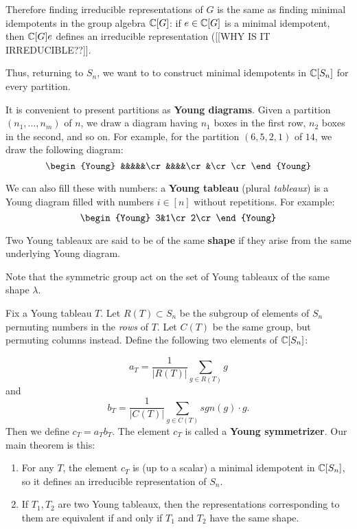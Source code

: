 \documentclass[11pt, english]{article}
\begin{document}
Therefore finding irreducible representations of $G$ is the same as finding minimal idempotents in the group algebra $\mathbb{C}[G]$: if $e \in \mathbb{C}[G]$ is a minimal idempotent, then $\mathbb{C}[G]e$ defines an irreducible representation ([[WHY IS IT IRREDUCIBLE??]].

Thus, returning to $S_n$, we want to to construct minimal idempotents in $\mathbb{C}[S_n]$ for every partition.

It is convenient to present partitions as \textbf{Young diagrams}. Given a partition $(n_1,\ldots,n_m)$ of $n$, we draw a diagram having $n_1$ boxes in the first row, $n_2$ boxes in the second, and so on. For example, for the partition $(6,5,2,1)$ of $14$, we draw the following diagram:
$$
\begin{Young}
&&&&&\cr
&&&&\cr
&\cr
\cr
\end{Young}
$$

We can also fill these with numbers: a \textbf{Young tableau} (plural \emph{tableaux}) is a Young diagram filled with numbers $i \in [n]$ without repetitions. For example:
$$
\begin{Young}
3&1\cr
2\cr
\end{Young}
$$

Two Young tableaux are said to be of the same \textbf{shape} if they arise from the same underlying Young diagram.

Note that the symmetric group act on the set of Young tableaux of the same shape $\lambda$. 

Fix a Young tableau $T$. Let $R(T) \subset S_n$ be the subgroup of elements of $S_n$ permuting numbers in the \emph{rows} of $T$. Let $C(T)$ be the same group, but permuting columns instead. Define the following two elements of $\mathbb{C}[S_n]$:

$$
a_T = \frac{1}{\lvert R(T) \rvert} \sum_{g \in R(T)} g 
$$
and
$$
b_T = \frac{1}{\lvert C(T) \rvert} \sum_{g \in C(T)} sgn(g) \cdot g.
$$
Then we define $c_T=a_T b_T$. The element $c_T$ is called a \textbf{Young symmetrizer}. Our main theorem is this:

\begin{thm}
  \begin{enumerate}
  \item For any $T$, the element $c_T$ is (up to a scalar) a minimal idempotent in $\mathbb{C}[S_n]$, so it defines an irreducible representation of $S_n$.
\item If $T_1,T_2$ are two Young tableaux, then the representations corresponding to them are equivalent if and only if $T_1$ and $T_2$ have the same shape.
  \end{enumerate}
\end{thm}
\end{document}
